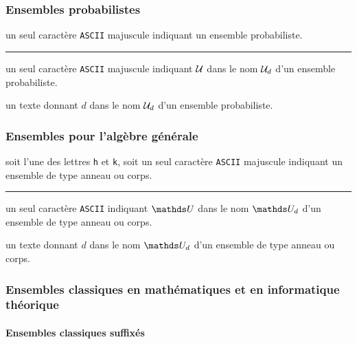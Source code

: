 \documentclass[12pt,a4paper]{article}
\theoremstyle{definition}
\newcommand\separation{
	\medskip
	\hfill\rule{0.5\textwidth}{0.75pt}\hfill
	\medskip
}
\newcommand\ascii{\texttt{ASCII}}
\begin{document}


\subsubsection{Ensembles probabilistes}




\IDarg{} un seul caractère \ascii{} majuscule indiquant un ensemble probabiliste.


\separation



 un seul caractère \ascii{} majuscule indiquant $\setproba{U}$ dans le nom $\setproba*{U}{d}$ d'un ensemble probabiliste.

 un texte donnant $d$ dans le nom $\setproba*{U}{d}$ d'un ensemble probabiliste.




\subsubsection{Ensembles pour l'algèbre générale}




\IDarg{} soit l'une des lettres  \texttt{h} et \texttt{k}, soit un seul caractère \ascii{} majuscule indiquant un ensemble de type anneau ou corps.


\separation



 un seul caractère \ascii{} indiquant $\setalge{U}$ dans le nom $\setalge*{U}{d}$ d'un ensemble de type anneau ou corps.

 un texte donnant $d$ dans le nom $\setalge*{U}{d}$ d'un ensemble de type anneau ou corps.




\subsubsection{Ensembles classiques en mathématiques et en informatique théorique} 

\paragraph{Ensembles classiques suffixés}
\end{document}
